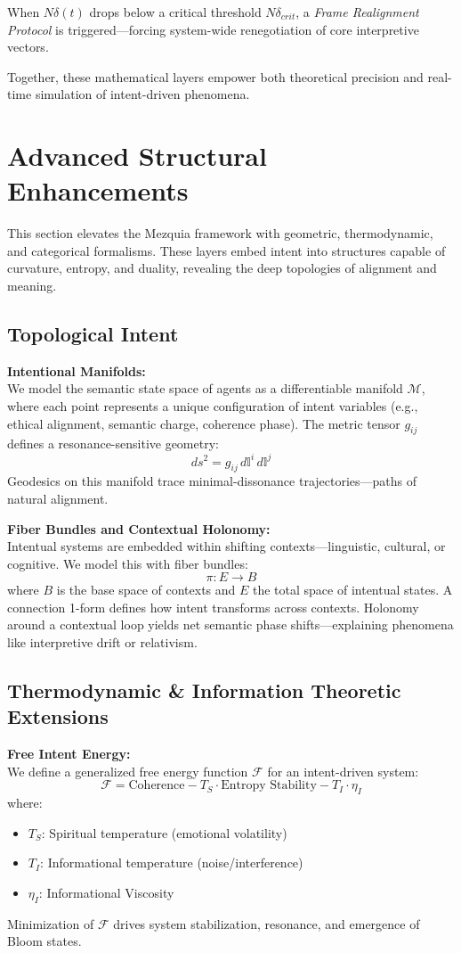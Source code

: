 \documentclass[12pt]{article}
\begin{document}
When \(N\delta(t)\) drops below a critical threshold \(N\delta_{crit}\), a \emph{Frame Realignment Protocol} is triggered—forcing system-wide renegotiation of core interpretive vectors.

Together, these mathematical layers empower both theoretical precision and real-time simulation of intent-driven phenomena.

\section{Advanced Structural Enhancements}

This section elevates the Mezquia framework with geometric, thermodynamic, and categorical formalisms. These layers embed intent into structures capable of curvature, entropy, and duality, revealing the deep topologies of alignment and meaning.

\subsection{Topological Intent}

\textbf{Intentional Manifolds:} \\
We model the semantic state space of agents as a differentiable manifold \(\mathcal{M}\), where each point represents a unique configuration of intent variables (e.g., ethical alignment, semantic charge, coherence phase). The metric tensor \(g_{ij}\) defines a resonance-sensitive geometry:
\[
ds^2 = g_{ij} \, d\mathbb{I}^i \, d\mathbb{I}^j
\]
Geodesics on this manifold trace minimal-dissonance trajectories—paths of natural alignment.

\textbf{Fiber Bundles and Contextual Holonomy:} \\
Intentual systems are embedded within shifting contexts—linguistic, cultural, or cognitive. We model this with fiber bundles:
\[
\pi: E \rightarrow B
\]
where \(B\) is the base space of contexts and \(E\) the total space of intentual states. A connection 1-form defines how intent transforms across contexts. Holonomy around a contextual loop yields net semantic phase shifts—explaining phenomena like interpretive drift or relativism.

\subsection{Thermodynamic \& Information Theoretic Extensions}

\textbf{Free Intent Energy:} \\
We define a generalized free energy function \(\mathcal{F}\) for an intent-driven system:
\[
\mathcal{F} = \text{Coherence} - T_S \cdot \text{Entropy Stability} - T_I \cdot \eta_I
\]
where:
\begin{itemize}
  \item \(T_S\): Spiritual temperature (emotional volatility)
  \item \(T_I\): Informational temperature (noise/interference)
  \item \(\eta_I\): Informational Viscosity
\end{itemize}
Minimization of \(\mathcal{F}\) drives system stabilization, resonance, and emergence of Bloom states.
\end{document}
